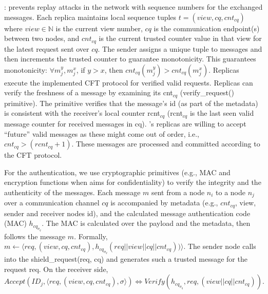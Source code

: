 : \projecttitle{} prevents replay attacks in the network with sequence numbers for the exchanged messages. Each replica maintains local sequence tuples $t = (view, cq, cnt_{cq})$ where $view \in \mathbb{N}$ is the current view number, $cq$ is the communication endpoint(s) between two nodes, and $cnt_{cq}$ is the current trusted counter value in that view for the latest request sent over $cq$. The sender assigns a unique tuple to messages and then increments the trusted counter to guarantee monotonicity. This guarantees monotonicity: $ \forall m_j^y, m_j^x$, if $y>x$, then $cnt_{cq}(m_j^y) > cnt_{cq}(m_j^x)$.
Replicas execute the implemented CFT protocol for verified valid requests. Replicas can verify the freshness of a message by examining its cnt$_{cq}$ (verify\_request() primitive). The primitive verifies that the message's id (as part of the metadata) is consistent with the receiver's local counter rcnt$_{cq}$ (rcnt$_{cq}$ is the last seen valid message counter for received messages in cq). \projecttitle{}'s replicas are willing to accept ``future'' valid messages as these might come out of order, i.e., $cnt_{cq} > (rcnt_{cq}+1)$. These messages are processed and committed according to the CFT protocol.%

 For the authentication, we use cryptographic primitives (e.g., MAC and encryption functions when \projecttitle{} aims for confidentiality) to verify the integrity and the authenticity of the messages. Each message $m$ sent from a node $n_i$ to a node $n_j$ over a communication channel $cq$ is accompanied by metadata (e.g., $cnt_{cq}$, view, sender and receiver nodes id), and the calculated message authentication code (MAC) $h_{cq_{\sigma_q}}$. The MAC is calculated over the payload and the metadata, then follows the message $m$. Formally, $m \leftarrow \langle req, (view,cq,cnt_{cq}),h_{cq_{\sigma_q}}(req ||view || cq || cnt_{cq})) \rangle$. The sender node calls into the shield\_request(req, cq) and generates such a trusted message for the request req. On the receiver side, $Accept(ID_j,\langle req,(view,cq,cnt_{cq}),\sigma\rangle) \Longleftrightarrow Verify(h_{cq_{\sigma_q}}, req, (view || cq ||cnt_{cq})).$



